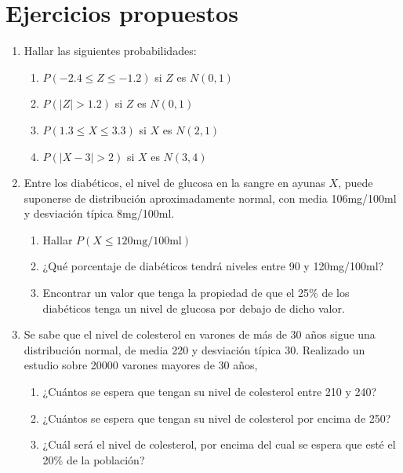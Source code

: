 \section{Ejercicios propuestos}
\begin{enumerate}[leftmargin=*]
\item Hallar las siguientes probabilidades:
\begin{enumerate}
\item $P(-2.4\leq Z \leq-1.2)$ si $Z$ es $N(0,1)$
\item $P(|Z|>1.2)$ si $Z$ es $N(0,1)$
\item $P(1.3\leq X \leq3.3)$ si $X$ es $N(2,1)$
\item $P(|X-3|>2)$ si $X$ es $N(3,4)$
\end{enumerate}

\item Entre los diabéticos, el nivel de glucosa en la sangre en ayunas $X$, puede suponerse de distribución
aproximadamente normal, con media 106mg/100ml y desviación típica 8mg/100ml.
\begin{enumerate}
\item Hallar $P(X\leq120\textrm{mg}/100\textrm{ml})$
\item ¿Qué porcentaje de diabéticos tendrá niveles entre 90 y 120mg/100ml?
\item Encontrar un valor que tenga la propiedad de que el 25\% de los diabéticos tenga un nivel de glucosa por debajo de dicho valor.
\end{enumerate}

\item Se sabe que el nivel de colesterol en varones de más de 30 años sigue una distribución normal, de media 220 y
desviación típica 30.
Realizado un estudio sobre 20000 varones mayores de 30 años,
\begin{enumerate}
\item ¿Cuántos se espera que tengan su nivel de colesterol entre 210 y 240?
\item ¿Cuántos se espera que tengan su nivel de colesterol por encima de 250?
\item ¿Cuál será el nivel de colesterol, por encima del cual se espera que esté el 20\% de la población?
\end{enumerate}
\end{enumerate}
